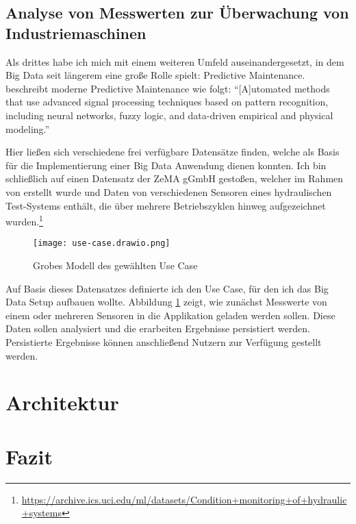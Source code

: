\subsection{Analyse von Messwerten zur Überwachung von Industriemaschinen}

Als drittes habe ich mich mit einem weiteren Umfeld auseinandergesetzt, in dem Big Data seit längerem eine große Rolle spielt: Predictive Maintenance.
\citeauthor{hashemian_state---art_2011} beschreibt moderne Predictive Maintenance wie folgt: \enquote{[A]utomated methods that use advanced signal processing techniques based on pattern recognition, including neural networks, fuzzy logic, and data-driven empirical and physical modeling.} \parencite{hashemian_state---art_2011}

Hier ließen sich verschiedene frei verfügbare Datensätze finden, welche als Basis für die Implementierung einer Big Data Anwendung dienen konnten.
Ich bin schließlich auf einen Datensatz der ZeMA gGmbH gestoßen, welcher im Rahmen von \cite{helwig_condition_2015} erstellt wurde und Daten von verschiedenen Sensoren eines hydraulischen Test-Systems enthält, die über mehrere Betriebszyklen hinweg aufgezeichnet wurden.\footnote{\url{https://archive.ics.uci.edu/ml/datasets/Condition+monitoring+of+hydraulic+systems}}

\begin{figure}[H]
  \centering
  \texttt{[image: use-case.drawio.png]}
  \caption{Grobes Modell des gewählten Use Case}\label{fig:use-case}
\end{figure}

Auf Basis dieses Datensatzes definierte ich den Use Case, für den ich das Big Data Setup aufbauen wollte.
Abbildung \ref{fig:use-case} zeigt, wie zunächst Messwerte von einem oder mehreren Sensoren in die Applikation geladen werden sollen.
Diese Daten sollen analysiert und die erarbeiten Ergebnisse persistiert werden.
Persistierte Ergebnisse können anschließend Nutzern zur Verfügung gestellt werden.

\section{Architektur}\label{sec:architektur}

\section{Fazit}\label{sec:fazit}

